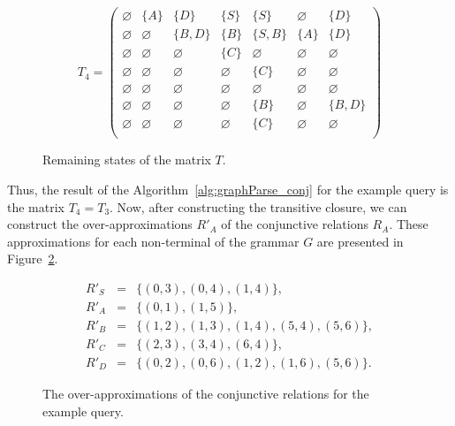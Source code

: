 \begin{figure}
	\[
	T_4 = \begin{pmatrix}
	\varnothing & \{A\} & \{D\} & \{S\} & \{S\} & \varnothing & \{D\} \\
	
	\varnothing & \varnothing & \{B, D\} & \{B\} & \{S,B\} & \{A\} & \{D\} \\
	
	\varnothing & \varnothing & \varnothing & \{C\} & \varnothing & \varnothing & \varnothing \\
	
	\varnothing & \varnothing & \varnothing & \varnothing & \{C\} & \varnothing & \varnothing \\
	
	\varnothing & \varnothing & \varnothing & \varnothing & \varnothing & \varnothing & \varnothing \\
	
	\varnothing & \varnothing & \varnothing & \varnothing & \{B\} & \varnothing & \{B, D\} \\
	
	\varnothing & \varnothing & \varnothing & \varnothing & \{C\} & \varnothing & \varnothing \\
	\end{pmatrix}
	\]
	\caption{Remaining states of the matrix $T$.}
	\label{ConjExampleQueryFinalIterations}
\end{figure}

Thus, the result of the Algorithm~\ref{alg:graphParse_conj} for the example query is the matrix $T_4 = T_3$. Now, after constructing the transitive closure, we can construct the over-approximations $R'_A$ of the conjunctive relations $R_A$. These approximations for each non-terminal of the grammar $G$ are presented in Figure~\ref{ConjExampleQueryCFRelations}.

\begin{figure}
	\begin{eqnarray}
	R'_S&=&\{(0,3),(0,4),(1,4)\},\\
	R'_{A}&=&\{(0,1),(1,5)\},\\
	R'_{B}&=&\{(1,2),(1,3),(1,4),(5,4),(5,6)\}, \\
	R'_{C}&=&\{(2,3),(3,4),(6,4)\}, \\
	R'_{D}&=&\{(0,2),(0,6),(1,2),(1,6),(5,6)\}.
	\end{eqnarray}
	\caption{The over-approximations of the conjunctive relations for the example query.}
	\label{ConjExampleQueryCFRelations}
\end{figure}

